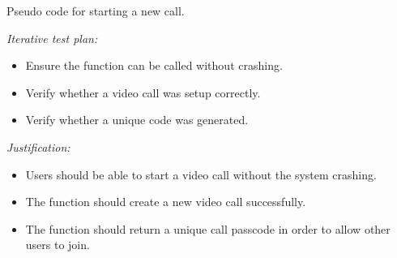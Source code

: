 \begin{algorithm}[H]
\caption{Pseudo code for starting a new call.}
\sffamily

\begin{algorithmic}[1]
    \State{}

     
     

     

    \State{}



    \State{}
  \EndFunction
\end{algorithmic}

\end{algorithm}
\mdseries

\textit{Iterative test plan: }  \\

\begin{itemize}

\item{Ensure the function can be called without crashing.}

\item{Verify whether a video call was setup correctly.}

\item{Verify whether a unique code was generated.}

\end{itemize}

\textit{Justification: } \\

\begin{itemize}

\item Users should be able to start a video call without the system crashing.

\item The function should create a new video call successfully.

\item The function should return a unique call passcode in order to allow other users to join.

\end{itemize}

